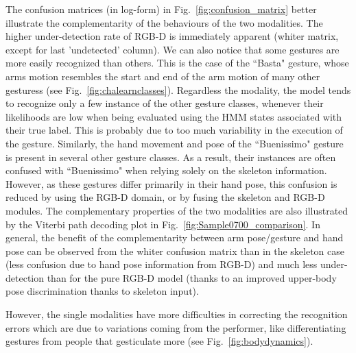 %
The confusion matrices (in log-form)
 in Fig.~\ref{fig:confusion_matrix} better illustrate the complementarity of the behaviours of the two modalities.
%
The higher under-detection rate of RGB-D is immediately apparent (whiter matrix, except for last 'undetected' column).
%
We can also notice that some gestures are more easily recognized than others.
This is the case  of the ``Basta" gesture,
whose arms motion  resembles the  start and end of the arm motion of many other gesturess (see Fig.~\ref{fig:chalearnclasses}).
Regardless the modality, the model tends to recognize only a few instance of the other gesture classes, whenever their likelihoods are low when being evaluated using the HMM states associated with their true label. This is probably due to too much variability in the execution of the gesture.
%
Similarly, the hand movement and pose of the ``Buenissimo" gesture is present in several other gesture classes. As a result, their instances are often confused with ``Buenissimo" when relying solely on the skeleton information.
%
However, as these gestures differ primarily in their hand pose, this confusion is reduced by using the RGB-D domain, or by fusing the skeleton and RGB-D modules.
%
The complementary properties of the two modalities are also illustrated by the Viterbi path decoding plot in Fig.~\ref{fig:Sample0700_comparison}.
In general, the benefit of the complementarity between arm pose/gesture and hand pose
can be observed from the whiter confusion matrix than in the skeleton case (less confusion due to hand pose information from RGB-D)
and much less under-detection than for the pure RGB-D model (thanks to an improved upper-body pose discrimination thanks to skeleton input).
%

However, the single modalities  have more difficulties in correcting the recognition errors which are due to variations coming from the performer,
like differentiating  gestures from people that gesticulate more (see Fig.~\ref{fig:bodydynamics}).

